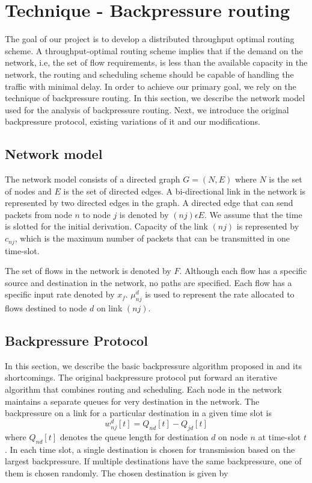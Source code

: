 \label{sec:backPressure}
\section{Technique - Backpressure routing}
The goal of our project is to develop a distributed throughput optimal routing scheme. A throughput-optimal routing scheme implies that if the demand on the network, i.e, the set of flow requirements, is less than the available capacity in the network, the routing and scheduling scheme should be capable of handling the traffic with minimal delay. In order to achieve our primary goal, we rely on the technique of backpressure routing. In this section, we describe the network model used for the analysis of backpressure routing. Next, we introduce the original backpressure protocol, existing variations of it and our modifications.

\subsection{Network model}
The network model consists of a directed graph $G=(N,E)$ where $N$ is the set of nodes and $E$ is the set of directed edges. A bi-directional link in the network is represented by two directed edges in the graph. A directed edge that can send packets from node $n$ to node $j$ is denoted by $(nj) \epsilon E$. We assume that the time is slotted for the initial derivation. Capacity of the link $(nj)$ is represented by $c_{nj}$, which is the maximum number of packets that can be transmitted in one time-slot.

The set of flows in the network is denoted by $F$. Although each flow has a specific source and destination in the network, no paths are specified. Each flow has a specific input rate denoted by $x_{f}$. $\mu_{nj}^{d}$ is used to represent the rate allocated to flows destined to node $d$ on link $(nj)$.

\subsection{Backpressure Protocol}
In this section, we describe the basic backpressure algorithm proposed in \cite{BP-orig} and its shortcomings. The original backpressure protocol put forward an iterative algorithm that combines routing and scheduling. Each node in the network maintains a separate queues for very destination in the network. The backpressure on a link for a particular destination in a given time slot is 
\begin{equation}
w_{nj}^{d}[t] = Q_{nd}[t] - Q_{jd}[t]
\end{equation}
where $Q_{nd}[t]$ denotes the queue length for destination $d$ on node $n$ at time-slot $t$. In each time slot, a single destination is chosen for transmission based on the largest backpressure. If multiple destinations have the same backpressure, one of them is chosen randomly. The chosen destination is given by

